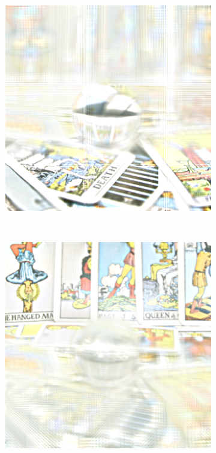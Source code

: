 \documentclass[11pt,a4paper,titlepage]{article}
\begin{document}
\begin{figure}
\begin{subfigure}[t]{0.19\textwidth}
	\end{subfigure}%
	~
	\begin{subfigure}[t]{0.19\textwidth}
		\includegraphics[width=\textwidth]{results/tile_blending/tarot6x6x512x512-512x512x5-sampling=2x_tileRes=200x200_overlap=0/5.png}
	\end{subfigure}%
	\\\quad
	\begin{subfigure}[t]{0.19\textwidth}
		\includegraphics[width=\textwidth]{results/tile_blending/tarot6x6x512x512-512x512x5-sampling=2x_tileRes=200x200_overlap=0.5/1.png} 

\end{subfigure}
\end{figure}
\end{document}
